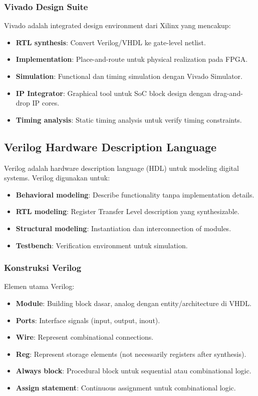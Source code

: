 \subsubsection{Vivado Design Suite}

Vivado adalah integrated design environment dari Xilinx yang mencakup:
\begin{itemize}
	\item \textbf{RTL synthesis}: Convert Verilog/VHDL ke gate-level netlist.
	\item \textbf{Implementation}: Place-and-route untuk physical realization pada FPGA.
	\item \textbf{Simulation}: Functional dan timing simulation dengan Vivado Simulator.
	\item \textbf{IP Integrator}: Graphical tool untuk SoC block design dengan drag-and-drop IP cores.
	\item \textbf{Timing analysis}: Static timing analysis untuk verify timing constraints.
\end{itemize}

\subsection{Verilog Hardware Description Language}

Verilog adalah hardware description language (HDL) untuk modeling digital systems. Verilog digunakan untuk:
\begin{itemize}
	\item \textbf{Behavioral modeling}: Describe functionality tanpa implementation details.
	\item \textbf{RTL modeling}: Register Transfer Level description yang synthesizable.
	\item \textbf{Structural modeling}: Instantiation dan interconnection of modules.
	\item \textbf{Testbench}: Verification environment untuk simulation.
\end{itemize}

\subsubsection{Konstruksi Verilog}

Elemen utama Verilog:
\begin{itemize}
	\item \textbf{Module}: Building block dasar, analog dengan entity/architecture di VHDL.
	\item \textbf{Ports}: Interface signals (input, output, inout).
	\item \textbf{Wire}: Represent combinational connections.
	\item \textbf{Reg}: Represent storage elements (not necessarily registers after synthesis).
	\item \textbf{Always block}: Procedural block untuk sequential atau combinational logic.
	\item \textbf{Assign statement}: Continuous assignment untuk combinational logic.
\end{itemize}

